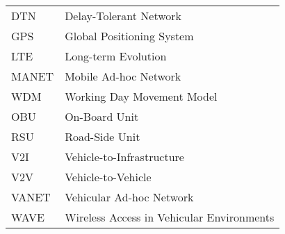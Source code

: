 

\begin{listaacron}

\begin{longtable}{ll}
DTN & Delay-Tolerant Network\\
GPS & Global Positioning System\\
LTE & Long-term Evolution\\
MANET & Mobile Ad-hoc Network\\
WDM & Working Day Movement Model\\
OBU & On-Board Unit\\
RSU & Road-Side Unit\\
V2I & Vehicle-to-Infrastructure\\
V2V & Vehicle-to-Vehicle\\
VANET & Vehicular Ad-hoc Network\\
WAVE & Wireless Access in Vehicular Environments\\






\end{longtable}

\end{listaacron}

